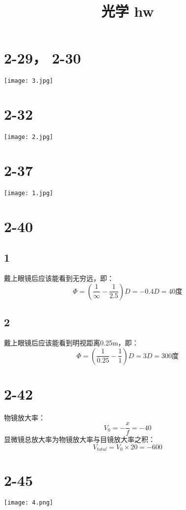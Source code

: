 \documentclass[UTF8,9pt]{ctexart}
\title{光学 hw}
\begin{document}
    \maketitle
    \section{2-29， 2-30}
        \begin{center}
            \texttt{[image: 3.jpg]}\\
        \end{center}
    \section{2-32}
        \begin{center}
            \texttt{[image: 2.jpg]}\\
        \end{center}
    \section{2-37} 
        \begin{center}
            \texttt{[image: 1.jpg]}\\
        \end{center}
        
    \section{2-40}
        \subsection*{1}
            戴上眼镜后应该能看到无穷远，即：
            $$\Phi=(\frac{1}{\infty}-\frac{1}{2.5})D=-0.4D=40\text{度}$$
        \subsection*{2}
            戴上眼镜后应该能看到明视距离0.25m，即：
            $$\Phi=(\frac{1}{0.25}-\frac{1}{1})D=3D=300\text{度}$$
    \section{2-42}
        物镜放大率：
        $$V_0=-\frac{x}{f}=-40$$
        显微镜总放大率为物镜放大率与目镜放大率之积：
        $$V_{total}=V_0\times20=-600$$
    \section{2-45}
        \begin{center}
            \texttt{[image: 4.png]}\\
        \end{center}
\end{document}
